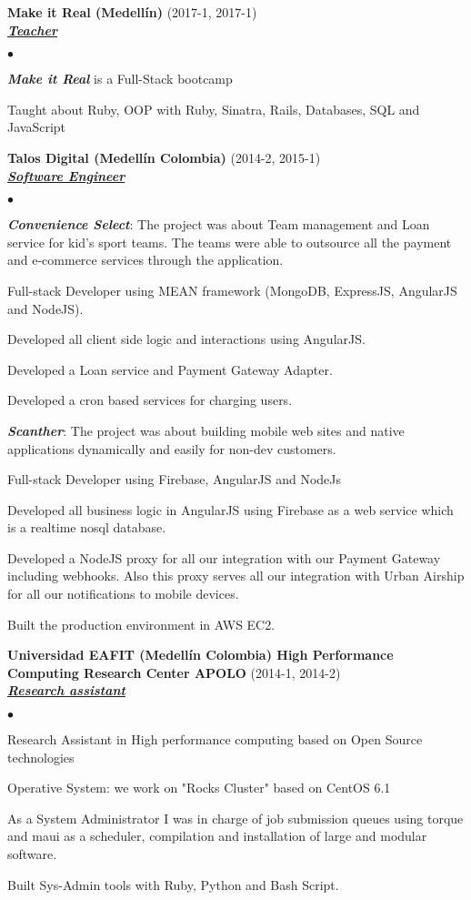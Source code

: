 \documentclass[a4paper]{article}
\newcommand{\employer}[3]{{
  \textbf{#1} (#2)\\ \underline{\textbf{\emph{#3}}}\\ }}
\newenvironment{achievements}{\begin{list}{$\bullet$}{\topsep 0pt \itemsep
  -2pt}}{\vspace*{4pt}\end{list}}
\newcommand{\emphasys}[1]{\textbf{\emph{#1}}}
\begin{document}
  \employer{Make it Real (Medell\'in)}{2017-1, 2017-1}{Teacher}
  \begin{achievements}
  \item \emphasys{Make it Real} is a Full-Stack bootcamp
  \item Taught about Ruby, OOP with Ruby, Sinatra, Rails, Databases, SQL and JavaScript
  \end{achievements}

  \employer{ Talos Digital (Medell\'in Colombia)}{2014-2, 2015-1}{Software Engineer}
  \begin{achievements}
  \item \emphasys{Convenience Select}: The project was about Team management and Loan service for kid's sport teams. The teams were able to outsource all the payment and e-commerce services through the application.
  \item Full-stack Developer using MEAN framework  (MongoDB, ExpressJS, AngularJS and NodeJS).
  \item Developed all client side logic and interactions using AngularJS.
  \item Developed a Loan service and Payment Gateway Adapter.
  \item Developed a cron based services for charging users.
  \item \emphasys{Scanther}: The project was about building mobile web sites and native applications dynamically and easily for non-dev customers.
  \item Full-stack Developer using Firebase, AngularJS and NodeJs
  \item Developed all business logic in AngularJS using Firebase as a web service which is a realtime nosql database.
  \item Developed a NodeJS proxy for all our integration with our Payment Gateway including webhooks. Also this proxy serves all our integration with Urban Airship for all our notifications to mobile devices.
  \item Built the production environment in AWS EC2.
  \end{achievements}

  \employer{ Universidad EAFIT (Medell\'in Colombia) High Performance Computing Research Center APOLO}{2014-1, 2014-2}{Research assistant}
  \begin{achievements}
  \item Research Assistant in High performance computing based on Open Source technologies
  \item Operative System: we work on "Rocks Cluster" based on CentOS 6.1
  \item As a System Administrator I was in charge of job submission queues using torque and maui as a scheduler, compilation and installation of large and modular software.
  \item Built Sys-Admin tools with Ruby, Python and Bash Script.
  \end{achievements}
\end{document}
